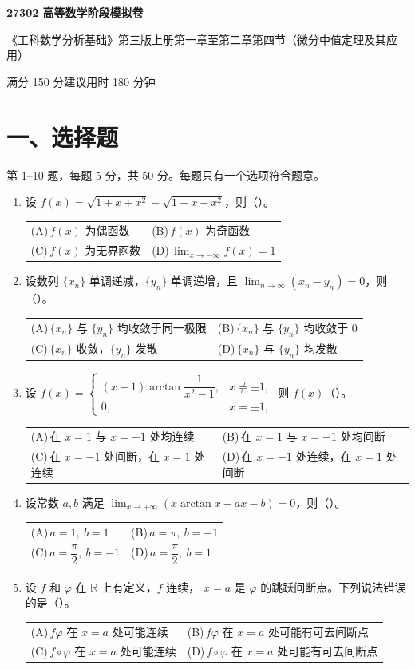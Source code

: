 \documentclass[UTF8,a4paper,zihao=-4,fontset=fandol]{ctexart}
\makeatletter
\newcommand{\choices}[4]{%
  \par\vspace{0.15em}
  \begin{tabularx}{\linewidth}{@{}X@{\hspace{1em}}X@{}}
    \textup{(A)}\,#1 & \textup{(B)}\,#2 \\
    \textup{(C)}\,#3 & \textup{(D)}\,#4
  \end{tabularx}\par}
\makeatother
\begin{document}
\begin{center}
  {\LARGE\bfseries 27302 高等数学阶段模拟卷\par}
  \vspace{0.4em}
  {\small 《工科数学分析基础》第三版上册\quad 第一章至第二章第四节（微分中值定理及其应用）\par}
  \vspace{0.4em}
  {\small 满分 150 分\qquad 建议用时 180 分钟}
\end{center}

\section*{一、选择题}
第 1--10 题，每题 5 分，共 50 分。每题只有一个选项符合题意。

\begin{enumerate}[itemsep=0.4em,topsep=0.5em]
  \item 设 $f(x)=\sqrt{1+x+x^2}-\sqrt{1-x+x^2}$，则（\quad）。
  \choices{$f(x)$ 为偶函数}{$f(x)$ 为奇函数}
          {$f(x)$ 为无界函数}{$\displaystyle\lim_{x\to-\infty} f(x)=1$}

  \item 设数列 $\{x_n\}$ 单调递减，$\{y_n\}$ 单调递增，且
  $\displaystyle\lim_{n\to\infty}(x_n-y_n)=0$，则（\quad）。
  \choices{$\{x_n\}$ 与 $\{y_n\}$ 均收敛于同一极限}
          {$\{x_n\}$ 与 $\{y_n\}$ 均收敛于 $0$}
          {$\{x_n\}$ 收敛，$\{y_n\}$ 发散}
          {$\{x_n\}$ 与 $\{y_n\}$ 均发散}

  \item 设 $f(x)=
    \begin{cases}
      (x+1)\arctan\dfrac{1}{x^2-1}, & x\ne\pm1,\\
      0, & x=\pm1,
    \end{cases}$
    则 $f(x)$（\quad）。
  \choices{在 $x=1$ 与 $x=-1$ 处均连续}
          {在 $x=1$ 与 $x=-1$ 处均间断}
          {在 $x=-1$ 处间断，在 $x=1$ 处连续}
          {在 $x=-1$ 处连续，在 $x=1$ 处间断}

  \item 设常数 $a,b$ 满足 $\displaystyle\lim_{x\to+\infty}(x\arctan x-ax-b)=0$，则（\quad）。
  \choices{$a=1,\ b=1$}{$a=\pi,\ b=-1$}
          {$a=\dfrac{\pi}{2},\ b=-1$}{$a=\dfrac{\pi}{2},\ b=1$}

  \item 设 $f$ 和 $\varphi$ 在 $\mathbb{R}$ 上有定义，$f$ 连续，
  $x=a$ 是 $\varphi$ 的跳跃间断点。下列说法错误的是（\quad）。
  \choices{$f\varphi$ 在 $x=a$ 处可能连续}
          {$f\varphi$ 在 $x=a$ 处可能有可去间断点}
          {$f\circ\varphi$ 在 $x=a$ 处可能连续}
          {$f\circ\varphi$ 在 $x=a$ 处可能有可去间断点}


\end{enumerate}
\end{document}
